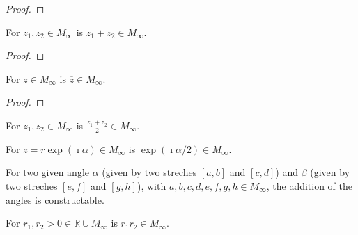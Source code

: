 \begin{proof}
\end{proof}

\begin{lemma}
    \label{lem:construction_add}
    For $z_1, z_2 \in M_{\infty}$ is $z_1 + z_2 \in M_{\infty}$.
\end{lemma}

\begin{proof}
\end{proof}

\begin{lemma}
    \label{lem:construction_conj}
    For $z \in M_{\infty}$ is $\overline{z} \in M_{\infty}$.
\end{lemma}

\begin{proof}
\end{proof}

\begin{lemma}
    \label{lem:construction_midpoint}
    For $z_1, z_2 \in M_{\infty}$ is $\frac{z_1 + z_2}{2} \in M_{\infty}$.
\end{lemma}

\begin{lemma}
    \label{lem:construction_halving_angle}
    For $z = r \exp(\imath \alpha) \in M_{\infty}$ is $\exp(\imath \alpha / 2) \in M_{\infty}$.
\end{lemma}


\begin{lemma}
    \label{lem:construction_add_angle}
    For two given angle $\alpha$ (given by two streches $[a,b]$ and $[c,d]$) and $\beta$ (given by two streches $[e,f]$ and $[g,h]$), with $ a,b,c,d,e,f,g,h \in M_{\infty}$, the addition of the angles is constructable.
\end{lemma}

\begin{lemma}
    \label{lem:construction_mult_pos_real}
    For $r_1, r_2 > 0 \in \mathbb{R}\cup M_{\infty}$ is $r_1 r_2 \in M_{\infty}$.
\end{lemma}

